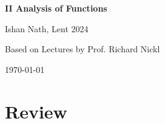 \documentclass[12pt]{article}
\begin{document}
\hypersetup{pageanchor=false}
\begin{titlepage}
	\begin{center}
		\vspace*{1em}
		\Huge
		\textbf{II Analysis of Functions}

		\vspace{1em}
		\large
		Ishan Nath, Lent 2024

		\vspace{1.5em}

		\Large

		Based on Lectures by Prof. Richard Nickl

		\vspace{1em}

		\large
		\today
	\end{center}
	
\end{titlepage}
\hypersetup{pageanchor=true}

\tableofcontents

\newpage

\setcounter{section}{-1}

\section{Review}
\label{sec:rev}
\end{document}
